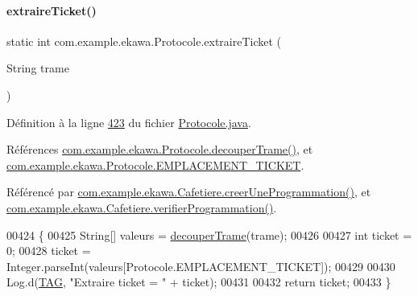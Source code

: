 \paragraph{\texorpdfstring{extraire\+Ticket()}{extraireTicket()}}
{\footnotesize\ttfamily static int com.\+example.\+ekawa.\+Protocole.\+extraire\+Ticket (\begin{DoxyParamCaption}\item[{String}]{trame }\end{DoxyParamCaption})\hspace{0.3cm}{\ttfamily [static]}}



Définition à la ligne \hyperlink{_protocole_8java_source_l00423}{423} du fichier \hyperlink{_protocole_8java_source}{Protocole.\+java}.



Références \hyperlink{_protocole_8java_source_l00208}{com.\+example.\+ekawa.\+Protocole.\+decouper\+Trame()}, et \hyperlink{_protocole_8java_source_l00090}{com.\+example.\+ekawa.\+Protocole.\+E\+M\+P\+L\+A\+C\+E\+M\+E\+N\+T\+\_\+\+T\+I\+C\+K\+ET}.



Référencé par \hyperlink{_cafetiere_8java_source_l00731}{com.\+example.\+ekawa.\+Cafetiere.\+creer\+Une\+Programmation()}, et \hyperlink{_cafetiere_8java_source_l00606}{com.\+example.\+ekawa.\+Cafetiere.\+verifier\+Programmation()}.


\begin{DoxyCode}
00424     \{
00425         String[] valeurs = \hyperlink{classcom_1_1example_1_1ekawa_1_1_protocole_a23c261e4ab5ad3c2ac60187f04ae40ea}{decouperTrame}(trame);
00426 
00427         \textcolor{keywordtype}{int} ticket = 0;
00428         ticket = Integer.parseInt(valeurs[Protocole.EMPLACEMENT\_TICKET]);
00429 
00430         Log.d(\hyperlink{classcom_1_1example_1_1ekawa_1_1_protocole_ae9b68fa0daac528421b887f19413f8f5}{TAG}, \textcolor{stringliteral}{"Extraire ticket = "} + ticket);
00431 
00432         \textcolor{keywordflow}{return} ticket;
00433     \}
\end{DoxyCode}
\mbox{\label{classcom_1_1example_1_1ekawa_1_1_protocole_a235ca0a3c40a50f4dc75346a60e54917}} 
